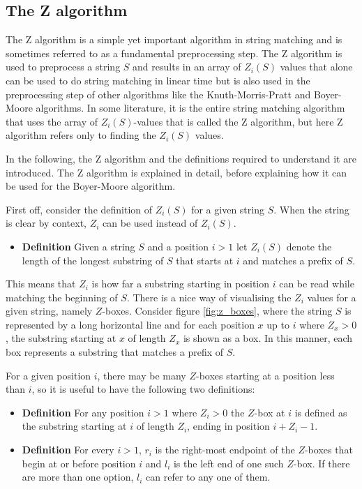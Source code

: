 \subsection{The Z algorithm}
The Z algorithm is a simple yet important algorithm in string matching and is sometimes referred to as a fundamental preprocessing step\cite{Gusfield1997AlgorithmsOS}. The Z algorithm is used to preprocess a string $S$ and results in an array of $Z_i(S)$ values that alone can be used to do string matching in linear time but is also used in the preprocessing step of other algorithms like the Knuth-Morris-Pratt and Boyer-Moore algorithms. In some literature, it is the entire string matching algorithm that uses the array of $Z_i(S)$-values that is called the Z algorithm, but here Z algorithm refers only to finding the $Z_i(S)$ values. 

In the following, the Z algorithm and the definitions required to understand it are introduced. The Z algorithm is explained in detail, before explaining how it can be used for the Boyer-Moore algorithm. 

First off, consider the definition of $Z_i(S)$ for a given string $S$. When the string is clear by context, $Z_i$ can be used instead of $Z_i(S)$. 

\begin{itemize}
    \item[] \textbf{Definition} Given a string $S$ and a position $i>1$ let $Z_i(S)$ denote the length of the longest substring of $S$ that starts at $i$ and matches a prefix of $S$. 
\end{itemize}

This means that $Z_i$ is how far a substring starting in position $i$ can be read while matching the beginning of $S$. There is a nice way of visualising the $Z_i$ values for a given string, namely $Z$-boxes. Consider figure \ref{fig:z_boxes}, where the string $S$ is represented by a long horizontal line and for each position $x$ up to $i$ where $Z_x>0$, the substring starting at $x$ of length $Z_x$ is shown as a box. In this manner, each box represents a substring that matches a prefix of $S$. 

For a given position $i$, there may be many $Z$-boxes starting at a position less than $i$, so it is useful to have the following two definitions:

\begin{itemize}
    \item[] \textbf{Definition} For any position $i>1$ where $Z_i>0$ the $Z$-box at $i$ is defined as the substring starting at $i$ of length $Z_i$, ending in position $i+Z_i-1$. 
    \item[] \textbf{Definition} For every $i>1$, $r_i$ is the right-most endpoint of the $Z$-boxes that begin at or before position $i$ and $l_i$ is the left end of one such $Z$-box. If there are more than one option, $l_i$ can refer to any one of them. 
\end{itemize}

